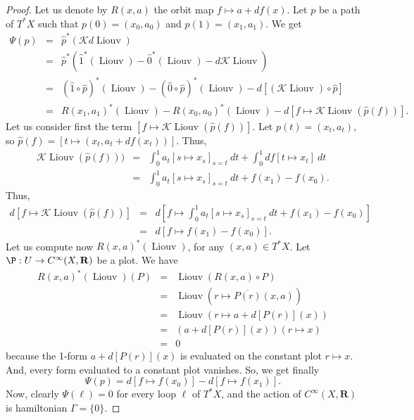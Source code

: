 \documentclass[10pt,reqno,twoside]{amsart}
\newcommand{\RR}{\mathbf{R}}
\newcommand{\cK}{\mathcal{K}}
\DeclareMathOperator{\Liouv}{Liouv}
\newcommand{\Cinfty}{C^\infty}
\newcommand{\but}{\hat{1}}
\newcommand{\source}{\hat{0}}
\newcommand{\R}{R}
\newcommand{\T}{T}
\theoremstyle{plain}
\theoremstyle{definition}
\begin{document}
\begin{proof}
    Let us denote by $\R(x,a)$ the orbit map $f \mapsto a + df(x)$.
    Let $p$ be a path of $\T^*X$ such that $p(0) = (x_0,a_0)$ and $p(1) = (x_1,a_1)$.
    We get
    \begin{eqnarray*}
      \Psi(p) & = & \hat p^*(\cK d\Liouv) \\
      & = & \hat p^*(\but^*(\Liouv) - \source^*(\Liouv) - d \cK\Liouv) \\
      & = & (\but \circ \hat p)^*(\Liouv) - (\source \circ \hat p)^*(\Liouv) - d [(\cK\Liouv) \circ \hat p] \\
      & = & \R(x_1,a_1)^*(\Liouv) - \R(x_0,a_0)^*(\Liouv) - d [f \mapsto \cK\Liouv (\hat p(f))].
    \end{eqnarray*}
    Let us consider first the term $[f \mapsto \cK\Liouv (\hat p(f))]$.
    Let $p(t) =(x_t,a_t)$,
    so $\hat p(f) = [t \mapsto (x_t,a_t + df(x_t))]$.
    Thus,
    \begin{eqnarray*}
      \cK\Liouv(\hat p(f))) & = &\int_0^1 a_t[s \mapsto x_s]_{s=t} \ dt + \int_0^1 df[t \mapsto x_t] \ dt \\
      & = & \int_0^1 a_t[s \mapsto x_s]_{s=t} \ dt + f(x_1) - f(x_0).
    \end{eqnarray*}
    Thus,
    \begin{eqnarray*}
      d [f \mapsto \cK\Liouv (\hat p(f))] &=& d[f \mapsto \int_0^1 a_t[s \mapsto x_s]_{s=t} \ dt + f(x_1) - f(x_0)] \\
      & = & d[f \mapsto f(x_1) - f(x_0)].
    \end{eqnarray*}
    Let us compute now $\R(x,a)^*(\Liouv)$,
    for any $(x,a) \in \T^*X$.
    Let $\P: U \to \Cinfty(X,\RR)$ be a plot.
    We have
    \begin{eqnarray*}
      \R(x,a)^*(\Liouv)(P) & = & \Liouv (\R(x,a) \circ P) \\
      & = & \Liouv(r \mapsto \overline{P (r)}(x,a)) \\
      & = & \Liouv(r \mapsto a + d[P (r)](x)) \\
      & = & (a +d[P (r)](x))(r \mapsto x) \\
      & = & 0
    \end{eqnarray*}
    because the 1-form $a +d[P (r)](x)$ is evaluated on the constant plot $r \mapsto x$.
    And,
    every form evaluated to a constant plot vanishes.
    So,
    we get finally
    $$
      \Psi(p) = d[f \mapsto f(x_0)] - d[f \mapsto f(x_1)].
      $$
    Now,
    clearly $\Psi(\ell) = 0$ for every loop $\ell$ of $\T^*X$,
    and the action of $\Cinfty(X,\RR)$ is hamiltonian $\Gamma = \{0\}$.

\end{proof}
\end{document}
